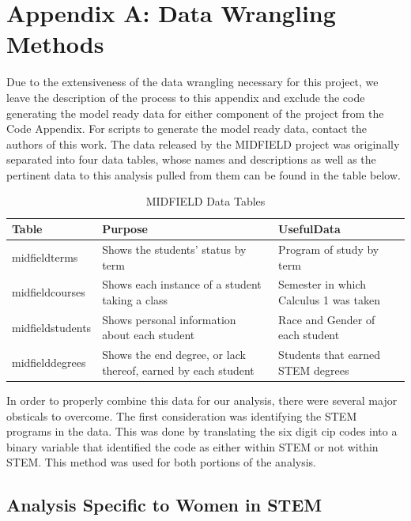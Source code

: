 \documentclass[]{article}
\begin{document}
\section{Appendix A: Data Wrangling
Methods}\label{appendix-a-data-wrangling-methods}

Due to the extensiveness of the data wrangling necessary for this
project, we leave the description of the process to this appendix and
exclude the code generating the model ready data for either component of
the project from the Code Appendix. For scripts to generate the model
ready data, contact the authors of this work. The data released by the
MIDFIELD project was originally separated into four data tables, whose
names and descriptions as well as the pertinent data to this analysis
pulled from them can be found in the table below.

\begin{table}[H]

\caption{\label{tab:midtables}MIDFIELD Data Tables}
\centering
\fontsize{12}{14}\selectfont
\begin{tabular}[t]{>{\raggedright\arraybackslash}p{1.1in}|>{\centering\arraybackslash}p{2.5in}|>{\centering\arraybackslash}p{2.5in}}
\hline
Table & Purpose & UsefulData\\
\hline
midfieldterms & Shows the students' status by term & Program of study by term\\
\hline
midfieldcourses & Shows each instance of a student taking a class & Semester in which Calculus 1 was taken\\
\hline
midfieldstudents & Shows personal information about each student & Race and Gender of each student\\
\hline
midfielddegrees & Shows the end degree, or lack thereof, earned by each student & Students that earned STEM degrees\\
\hline
\end{tabular}
\end{table}

In order to properly combine this data for our analysis, there were
several major obsticals to overcome. The first consideration was
identifying the STEM programs in the data. This was done by translating
the six digit cip codes into a binary variable that identified the code
as either within STEM or not within STEM. \cite{cip6} This method was
used for both portions of the analysis.

\subsection{Analysis Specific to Women in
STEM}\label{analysis-specific-to-women-in-stem}
\end{document}
